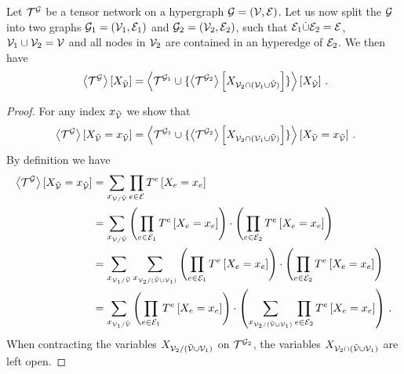 \begin{theorem}\label{the:splittingContractions}
	Let $\mathcal{T}^{\mathcal{G}}$ be a tensor network on a hypergraph $\mathcal{G}=(\mathcal{V},\mathcal{E})$.
	Let us now split the $\mathcal{G}$ into two graphs $\mathcal{G}_1=(\mathcal{V}_1,\mathcal{E}_1)$ and $\mathcal{G}_2=(\mathcal{V}_2,\mathcal{E}_2)$, such that $\mathcal{E}_1\dot{\cup}\mathcal{E}_2=\mathcal{E}$, $\mathcal{V}_1\cup\mathcal{V}_2=\mathcal{V}$ and all nodes in $\mathcal{V}_2$ are contained in an hyperedge of $\mathcal{E}_2$.
	We then have
		\[ \contractionof{\tnetof{\graph}}{\catvariableof{\secnodes}} 
		= 
		\contractionof{\tnetof{\graph_1} \cup \{
			\contractionof{\tnetof{\graph_2}}{\catvariableof{\nodes_2\cap(\nodes_1\cup\secnodes)}}
		\}}{\catvariableof{\secnodes}}   \, . \]
\end{theorem}
\begin{proof}
	For any index $x_{\tilde{\mathcal{V}}}$ we show that 
			\[ \contractionof{\tnetof{\graph}}{\indexedcatvariableof{\secnodes}} 
		= 
		\contractionof{\tnetof{\graph_1} \cup \{
			\contractionof{\tnetof{\graph_2}}{\catvariableof{\nodes_2\cap(\nodes_1\cup\secnodes)}}
		\}}{\indexedcatvariableof{\secnodes}}   \, . \]
	By definition we have
	\begin{align*}
		\left\langle \mathcal{T}^{\mathcal{G}}\right\rangle \left[ X_{\tilde{\mathcal{V}}}=x_{\tilde{\mathcal{V}}} \right] 
		& = \sum_{x_{\mathcal{V}/\tilde{\mathcal{V}}}} \prod_{e\in\mathcal{E}} T^{e}\left[X_{e}=x_{e}\right] \\
		& = \sum_{x_{\mathcal{V}/\tilde{\mathcal{V}}}} 
		 	\left( \prod_{e\in\mathcal{E}_1} T^{e}\left[X_{e}=x_{e}\right] \right) 
		 	\cdot \left( \prod_{e\in\mathcal{E}_2} T^{e}\left[X_{e}=x_{e}\right]  \right) \\
		& =  \sum_{x_{\mathcal{V}_1/\tilde{\mathcal{V}}}} \sum_{x_{\mathcal{V}_2/(\tilde{\mathcal{V}}\cup\mathcal{V}_1)}} 
			\left( \prod_{e\in\mathcal{E}_1} T^{e}\left[X_{e}=x_{e}\right] \right) 
		 	\cdot \left( \prod_{e\in\mathcal{E}_2} T^{e}\left[X_{e}=x_{e}\right]  \right) \\
		& =  \sum_{x_{\mathcal{V}_1/\tilde{\mathcal{V}}}}  
			\left( \prod_{e\in\mathcal{E}_1} T^{e}\left[X_{e}=x_{e}\right] \right) 
		 	\cdot \left( \sum_{x_{\mathcal{V}_2/(\tilde{\mathcal{V}}\cup\mathcal{V}_1)}}  \prod_{e\in\mathcal{E}_2} T^{e}\left[X_{e}=x_{e}\right]  \right) \, .
	\end{align*}
	When contracting the variables $X_{\mathcal{V}_2/(\tilde{\mathcal{V}}\cup\mathcal{V}_1)}$ on $\mathcal{T}^{\mathcal{G}_2}$, the variables $X_{\mathcal{V}_2\cap(\tilde{\mathcal{V}}\cup\mathcal{V}_1)}$ are left open. 

\end{proof}
